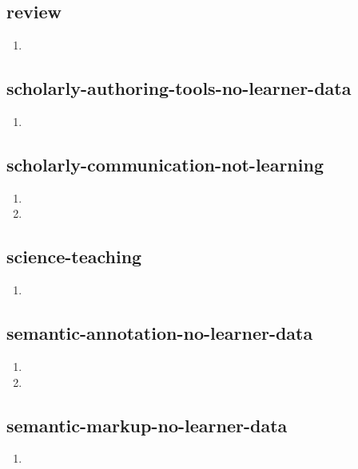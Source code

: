 \documentclass{article}
\begin{document}
\subsection{review}
\begin{enumerate}
\item {}
\end{enumerate}

\subsection{scholarly-authoring-tools-no-learner-data}
\begin{enumerate}
\item {}
\end{enumerate}

\subsection{scholarly-communication-not-learning}
\begin{enumerate}
\item {}
\item {}
\end{enumerate}

\subsection{science-teaching}
\begin{enumerate}
\item {}
\end{enumerate}

\subsection{semantic-annotation-no-learner-data}
\begin{enumerate}
\item {}
\item {}
\end{enumerate}

\subsection{semantic-markup-no-learner-data}
\begin{enumerate}
\item {}
\end{enumerate}
\end{document}
